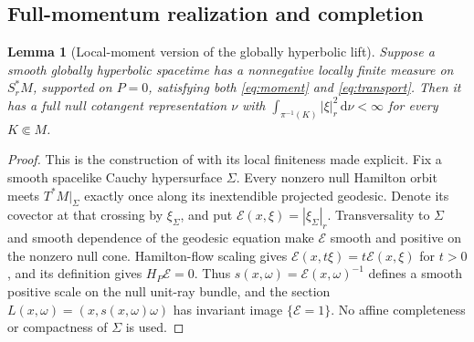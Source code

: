 \documentclass[11pt,a4paper]{article}
\numberwithin{equation}{section}
\newcommand{\dd}{\mathrm d}
\newtheorem{lemma}[theorem]{Lemma}
\theoremstyle{definition}
\begin{document}
\subsection{Full-momentum realization and completion}

\begin{lemma}[Local-moment version of the globally hyperbolic lift]\label{lem:lift}
Suppose a smooth globally hyperbolic spacetime has a nonnegative locally finite measure on $S_r^*M$, supported on $P=0$, satisfying both \eqref{eq:moment} and \eqref{eq:transport}. Then it has a full null cotangent representation $\nu$ with $\int_{\pi^{-1}(K)}|\xi|_r^2\,\dd\nu<\infty$ for every $K\Subset M$.
\end{lemma}
\begin{proof}
This is the construction of \cite[Lemma 2.5]{HLelliptic} with its local
finiteness made explicit. Fix a smooth spacelike Cauchy hypersurface
$\Sigma$. Every nonzero null Hamilton orbit meets $T^*M|_\Sigma$ exactly
once along its inextendible projected geodesic. Denote its covector at
that crossing by $\xi_\Sigma$, and put
$\mathcal E(x,\xi)=|\xi_\Sigma|_r$. Transversality to $\Sigma$ and
smooth dependence of the geodesic equation make $\mathcal E$ smooth
and positive on the nonzero null cone. Hamilton-flow scaling gives
$\mathcal E(x,t\xi)=t\mathcal E(x,\xi)$ for $t>0$, and its definition
gives $H_P\mathcal E=0$. Thus
$s(x,\omega)=\mathcal E(x,\omega)^{-1}$ defines a smooth positive scale
on the null unit-ray bundle, and the section
$L(x,\omega)=(x,s(x,\omega)\omega)$ has invariant image
$\{\mathcal E=1\}$. No affine completeness or compactness of
$\Sigma$ is used.


\end{proof}
\end{document}
